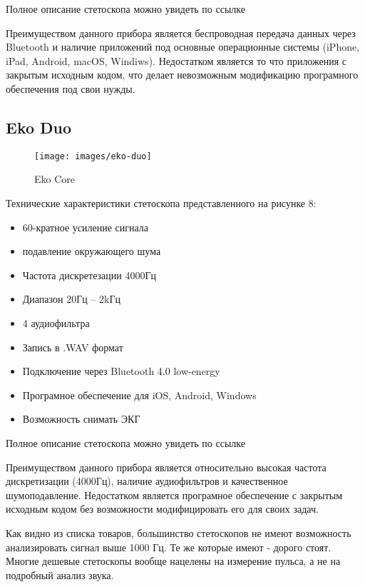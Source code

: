 \documentclass[../main.tex]{subfiles}
\begin{document}
Полное описание стетоскопа можно увидеть по ссылке \cite{eko-core}

Преимуществом данного прибора является беспроводная передача данных через Bluetooth и наличие приложений под основные операционные системы (iPhone, iPad, Android, macOS, Windiws). Недостатком является то что приложения с закрытым исходным кодом, что делает невозможным модификацию програмного обеспечения под свои нужды.

\subsection{Eko Duo}
\begin{figure}[H]
\centering
\texttt{[image: images/eko-duo]}
\caption{Eko Core}
\end{figure}

Технические характеристики \cite{eko-duo} стетоскопа представленного на рисунке 8:
\begin{itemize}
  \item 60-кратное усиление сигнала
  \item подавление окружающего шума
  \item Частота дискретезации 4000Гц
  \item Диапазон 20Гц – 2kГц
  \item 4 аудиофильтра
  \item Запись в .WAV формат
  \item Подключение через Bluetooth 4.0 low-energy
  \item Програмное обеспечение для iOS, Android, Windows
  \item Возможность снимать ЭКГ
\end{itemize}

Полное описание стетоскопа можно увидеть по ссылке \cite{eko-duo}

Преимуществом данного прибора является относительно высокая частота дискретизации (4000Гц), наличие аудиофильтров и качественное шумоподавление. Недостатком является програмное обеспечение с закрытым исходным кодом без возможности модифицировать его для своих задач.

Как видно из списка товаров, большинство стетоскопов не имеют возможность анализировать сигнал выше 1000 Гц. Те же которые имеют - дорого стоят. Многие дешевые стетоскопы вообще нацелены на измерение пульса, а не на подробный анализ звука.
\newpage
\end{document}
